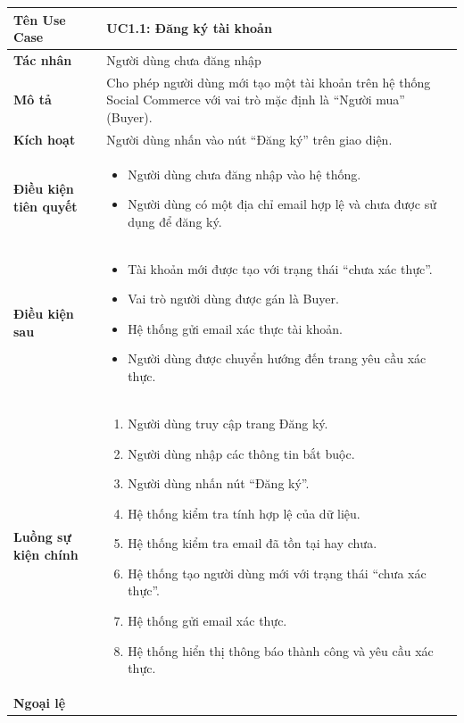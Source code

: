 \begin{table}[H]
\centering
\begin{tabularx}{\textwidth}{|l|X|}
\hline
\textbf{Tên Use Case} & \textbf{UC1.1: Đăng ký tài khoản} \\ \hline
\textbf{Tác nhân} & Người dùng chưa đăng nhập \\ \hline
\textbf{Mô tả} & Cho phép người dùng mới tạo một tài khoản trên hệ thống Social Commerce với vai trò mặc định là ``Người mua'' (Buyer). \\ \hline
\textbf{Kích hoạt} & Người dùng nhấn vào nút ``Đăng ký'' trên giao diện. \\ \hline
\textbf{Điều kiện tiên quyết} & 
\begin{itemize}
    \item Người dùng chưa đăng nhập vào hệ thống.
    \item Người dùng có một địa chỉ email hợp lệ và chưa được sử dụng để đăng ký.
\end{itemize} \\ \hline
\textbf{Điều kiện sau} & 
\begin{itemize}
    \item Tài khoản mới được tạo với trạng thái ``chưa xác thực''.
    \item Vai trò người dùng được gán là Buyer.
    \item Hệ thống gửi email xác thực tài khoản.
    \item Người dùng được chuyển hướng đến trang yêu cầu xác thực.
\end{itemize} \\ \hline
\textbf{Luồng sự kiện chính} & 
\begin{enumerate}
    \item Người dùng truy cập trang Đăng ký.
    \item Người dùng nhập các thông tin bắt buộc.
    \item Người dùng nhấn nút ``Đăng ký''.
    \item Hệ thống kiểm tra tính hợp lệ của dữ liệu.
    \item Hệ thống kiểm tra email đã tồn tại hay chưa.
    \item Hệ thống tạo người dùng mới với trạng thái ``chưa xác thực''.
    \item Hệ thống gửi email xác thực.
    \item Hệ thống hiển thị thông báo thành công và yêu cầu xác thực.
\end{enumerate} \\ \hline
\textbf{Ngoại lệ} & 

\end{tabularx}
\end{table}

